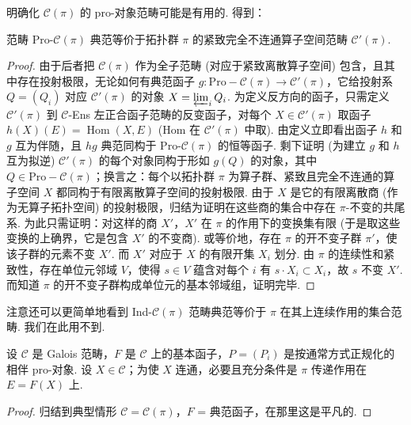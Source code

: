 明确化 $\mathcal{C}(\pi)$ 的 pro-对象范畴可能是有用的. 得到：

\begin{proposition}\label{prop:V.5.2}
范畴 Pro-$\mathcal{C}(\pi)$ 典范等价于拓扑群 $\pi$ 的紧致完全不连通算子空间范畴 $\mathcal{C}'(\pi)$.
\end{proposition}

\begin{proof}
由于后者把 $\mathcal{C}(\pi)$ 作为全子范畴 (对应于紧致离散算子空间) 包含，且其中存在投射极限，无论如何有典范函子 $g \colon \mathrm{Pro-}\mathcal{C}(\pi) \to \mathcal{C}'(\pi)$，它给投射系 $Q = (Q_i)$ 对应 $\mathcal{C}'(\pi)$ 的对象 $X = \varprojlim_i Q_i$. 为定义反方向的函子，只需定义 $\mathcal{C}'(\pi)$ 到 $\mathcal{C}$-Ens 左正合函子范畴的反变函子，对每个 $X \in \mathcal{C}'(\pi)$ 取函子 $h(X)(E) = \operatorname{Hom}(X, E)$ (Hom 在 $\mathcal{C}'(\pi)$ 中取). 由定义立即看出函子 $h$ 和 $g$ 互为伴随，且 $hg$ 典范同构于 Pro-$\mathcal{C}(\pi)$ 的恒等函子. 剩下证明 (为建立 $g$ 和 $h$ 互为拟逆) $\mathcal{C}'(\pi)$ 的每个对象同构于形如 $g(Q)$ 的对象，其中 $Q \in \mathrm{Pro-}\mathcal{C}(\pi)$；换言之：每个以拓扑群 $\pi$ 为算子群、紧致且完全不连通的算子空间 $X$ 都同构于有限离散算子空间的投射极限. 由于 $X$ 是它的有限离散商 (作为无算子拓扑空间) 的投射极限，归结为证明在这些商的集合中存在 $\pi$-不变的共尾系. 为此只需证明：对这样的商 $X'$，$X'$ 在 $\pi$ 的作用下的变换集有限 (于是取这些变换的上确界，它是包含 $X'$ 的不变商). 或等价地，存在 $\pi$ 的开不变子群 $\pi'$，使该子群的元素不变 $X'$. 而 $X'$ 对应于 $X$ 的有限开集 $X_i$ 划分. 由 $\pi$ 的连续性和紧致性，存在单位元邻域 $V$，使得 $s \in V$ 蕴含对每个 $i$ 有 $s \cdot X_i \subset X_i$，故 $s$ 不变 $X'$. 而知道 $\pi$ 的开不变子群构成单位元的基本邻域组，证明完毕.
\end{proof}

注意还可以更简单地看到 Ind-$\mathcal{C}(\pi)$ 范畴典范等价于 $\pi$ 在其上连续作用的集合范畴. 我们在此用不到.

\begin{proposition}\label{prop:V.5.3}
设 $\mathcal{C}$ 是 Galois 范畴，$F$ 是 $\mathcal{C}$ 上的基本函子，$P = (P_i)$ 是按通常方式正规化的相伴 pro-对象. 设 $X \in \mathcal{C}$；为使 $X$ 连通，必要且充分条件是 $\pi$ 传递作用在 $E = F(X)$ 上.
\end{proposition}

\begin{proof}
归结到典型情形 $\mathcal{C} = \mathcal{C}(\pi)$，$F$ = 典范函子，在那里这是平凡的.
\end{proof}

